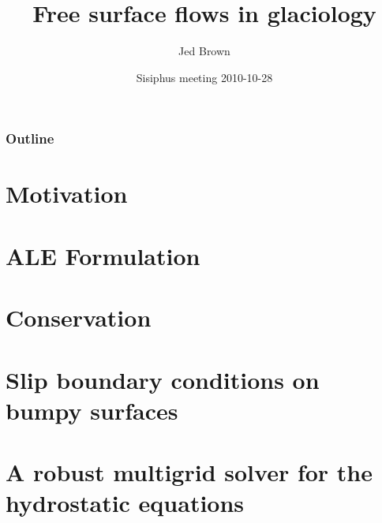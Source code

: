 \documentclass{beamer}
\title{Free surface flows in glaciology}
\author{Jed Brown}
\institute[ETH Z\"urich]
{
  Laboratory of Hydrology, Hydraulics, and Glaciology \\
  ETH Z\"urich
}
\date[2010-10-28]{Sisiphus meeting 2010-10-28}
\begin{document}
\lstset{language=C}
\normalem

\begin{frame}
\titlepage
\end{frame}

\begin{frame}
  \frametitle{Outline}
  \tableofcontents
\end{frame}

\section{Motivation}







\section{ALE Formulation}

%



\section{Conservation}


\section[Slip]{Slip boundary conditions on bumpy surfaces}


\section[Hydrostatic]{A robust multigrid solver for the hydrostatic equations}



\end{document}
